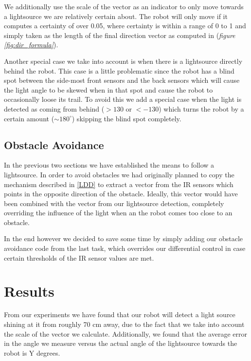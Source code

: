 \documentclass[paper=a4, fontsize=12pt]{scrartcl}	%
\numberwithin{equation}{section}		%
\numberwithin{figure}{section}			%
\numberwithin{table}{section}				%
\begin{document}

We additionally use the scale of the vector as an indicator to only move towards a lightsource we are relatively certain about. The robot will only move if it computes a certainty of over 0.05, where certainty is within a range of 0 to 1 and simply taken as the length of the final direction vector as computed in (\emph{figure \ref{fig:dir_formula}}).

Another special case we take into account is when there is a lightsource directly behind the robot. This case is a little problematic since the robot has a blind spot between the side-most front sensors and the back sensors which will cause the light angle to be skewed when in that spot and cause the robot to occasionally loose its trail. To avoid this we add a special case when the light is detected as coming from behind (\(> 130\) or \(< -130\)) which turns the robot by a certain amount (\(\sim180^{\circ}\)) skipping the blind spot completely.
\subsection{Obstacle Avoidance}
In the previous two sections we have established the means to follow a lightsource. In order to avoid obstacles we had originally planned to copy the mechanism described in \ref{LDD} to extract a vector from the IR sensors which points in the opposite direction of the obstacle. Ideally, this vector would have been combined with the vector from our lightsource detection, completely overriding the influence of the light when an the robot comes too close to an obstacle. 

In the end however we decided to save some time by simply adding our obstacle avoidance code from the last task, which overrides our differential control in case certain thresholds of the IR sensor values are met.
\section{Results}
From our experiments we have found that our robot will detect a light source shining at it from roughly 70 cm away, due to the fact that we take into account the scale of the vector we calculate. Additionally, we found that the average error in the angle we measure versus the actual angle of the lightsource towards the robot is Y degrees.
\end{document}
